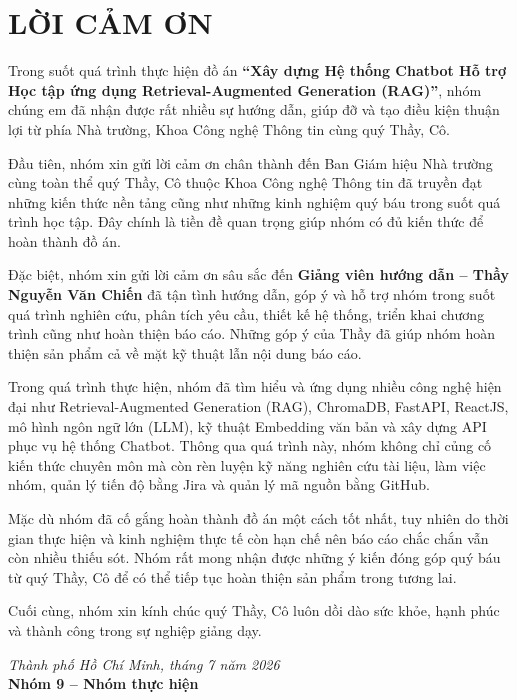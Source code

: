 \chapter*{LỜI CẢM ƠN}

Trong suốt quá trình thực hiện đồ án \textbf{``Xây dựng Hệ thống Chatbot Hỗ trợ Học tập ứng dụng Retrieval-Augmented Generation (RAG)''}, nhóm chúng em đã nhận được rất nhiều sự hướng dẫn, giúp đỡ và tạo điều kiện thuận lợi từ phía Nhà trường, Khoa Công nghệ Thông tin cùng quý Thầy, Cô.

Đầu tiên, nhóm xin gửi lời cảm ơn chân thành đến Ban Giám hiệu Nhà trường cùng toàn thể quý Thầy, Cô thuộc Khoa Công nghệ Thông tin đã truyền đạt những kiến thức nền tảng cũng như những kinh nghiệm quý báu trong suốt quá trình học tập. Đây chính là tiền đề quan trọng giúp nhóm có đủ kiến thức để hoàn thành đồ án.

Đặc biệt, nhóm xin gửi lời cảm ơn sâu sắc đến \textbf{Giảng viên hướng dẫn -- Thầy Nguyễn Văn Chiến} đã tận tình hướng dẫn, góp ý và hỗ trợ nhóm trong suốt quá trình nghiên cứu, phân tích yêu cầu, thiết kế hệ thống, triển khai chương trình cũng như hoàn thiện báo cáo. Những góp ý của Thầy đã giúp nhóm hoàn thiện sản phẩm cả về mặt kỹ thuật lẫn nội dung báo cáo.

Trong quá trình thực hiện, nhóm đã tìm hiểu và ứng dụng nhiều công nghệ hiện đại như Retrieval-Augmented Generation (RAG), ChromaDB, FastAPI, ReactJS, mô hình ngôn ngữ lớn (LLM), kỹ thuật Embedding văn bản và xây dựng API phục vụ hệ thống Chatbot. Thông qua quá trình này, nhóm không chỉ củng cố kiến thức chuyên môn mà còn rèn luyện kỹ năng nghiên cứu tài liệu, làm việc nhóm, quản lý tiến độ bằng Jira và quản lý mã nguồn bằng GitHub.

Mặc dù nhóm đã cố gắng hoàn thành đồ án một cách tốt nhất, tuy nhiên do thời gian thực hiện và kinh nghiệm thực tế còn hạn chế nên báo cáo chắc chắn vẫn còn nhiều thiếu sót. Nhóm rất mong nhận được những ý kiến đóng góp quý báu từ quý Thầy, Cô để có thể tiếp tục hoàn thiện sản phẩm trong tương lai.

Cuối cùng, nhóm xin kính chúc quý Thầy, Cô luôn dồi dào sức khỏe, hạnh phúc và thành công trong sự nghiệp giảng dạy.

\vspace{1cm}
\begin{flushright}
  \textit{Thành phố Hồ Chí Minh, tháng 7 năm 2026}\\[0.3cm]
  \textbf{Nhóm 9 -- Nhóm thực hiện}
\end{flushright}